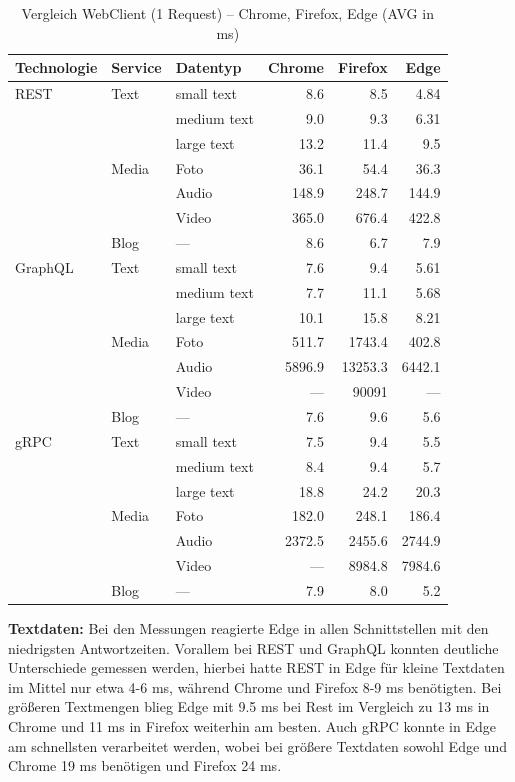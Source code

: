 	\begin{table}[h]
		\centering
		\caption{Vergleich WebClient (1 Request) – Chrome, Firefox, Edge (AVG in ms)}
		\label{tab:browser-comparison-1req}
		\renewcommand{\arraystretch}{1.2}
		\begin{tabular}{|l|l|l|r|r|r|}
			\hline
			\textbf{Technologie} & \textbf{Service} & \textbf{Datentyp} & \textbf{Chrome} & \textbf{Firefox} & \textbf{Edge} \\
			\hline
			REST & Text  & small text  & 8.6   & 8.5   & 4.84 \\
			&       & medium text & 9.0   & 9.3   & 6.31 \\
			&       & large text  & 13.2  & 11.4  & 9.5  \\
			& Media & Foto        & 36.1  & 54.4  & 36.3 \\
			&       & Audio       & 148.9 & 248.7 & 144.9 \\
			&       & Video       & 365.0 & 676.4 & 422.8 \\
			& Blog  & —           & 8.6   & 6.7   & 7.9  \\
			\hline
			GraphQL & Text  & small text  & 7.6   & 9.4   & 5.61 \\
			&       & medium text & 7.7   & 11.1  & 5.68 \\
			&       & large text  & 10.1  & 15.8  & 8.21 \\
			& Media & Foto        & 511.7 & 1743.4 & 402.8 \\
			&       & Audio       & 5896.9 & 13253.3 & 6442.1 \\
			&       & Video       & —     & 90091  & — \\
			& Blog  & —           & 7.6   & 9.6   & 5.6 \\
			\hline
			gRPC & Text  & small text  & 7.5   & 9.4   & 5.5 \\
			&       & medium text & 8.4   & 9.4   & 5.7 \\
			&       & large text  & 18.8  & 24.2  & 20.3 \\
			& Media & Foto        & 182.0 & 248.1 & 186.4 \\
			&       & Audio       & 2372.5 & 2455.6 & 2744.9 \\
			&       & Video       & —     & 8984.8 & 7984.6 \\
			& Blog  & —           & 7.9   & 8.0   & 5.2 \\
			\hline
		\end{tabular}
	\end{table}

\clearpage
\textbf{Textdaten:}  
Bei den Messungen reagierte Edge in allen Schnittstellen mit den niedrigsten Antwortzeiten. Vorallem bei REST und GraphQL konnten deutliche Unterschiede gemessen werden, hierbei hatte REST in Edge für kleine Textdaten im Mittel nur etwa 4-6 ms, während Chrome und Firefox 8-9 ms benötigten. Bei größeren Textmengen blieg Edge mit 9.5 ms bei Rest im Vergleich zu 13 ms in Chrome und 11 ms in Firefox weiterhin am besten.
Auch gRPC konnte in Edge am schnellsten verarbeitet werden, wobei bei größere Textdaten sowohl Edge und Chrome 19 ms benötigen und Firefox 24 ms. 


